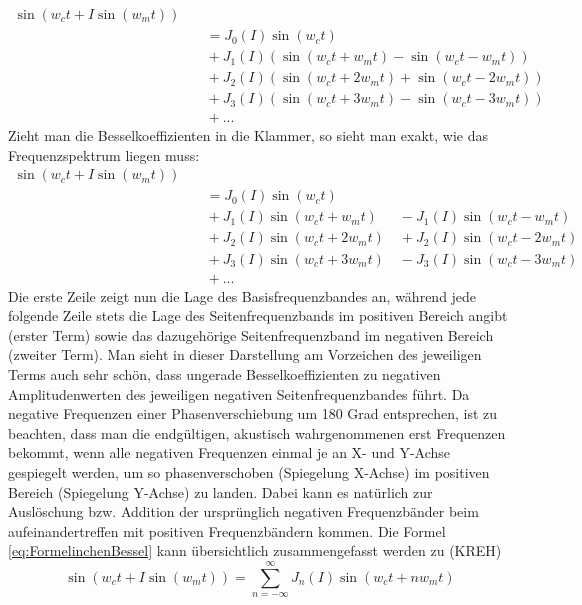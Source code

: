 \begin{equation}
\begin{split}
\sin(w_ct + I\sin(w_mt)) \\ &\quad = J_0(I)\sin(w_ct) \\ &\quad + J_1(I)(\sin(w_ct + w_mt) - \sin(w_ct - w_mt)) \\ &\quad + J_2(I)(\sin(w_ct + 2w_mt)+\sin(w_ct-2w_mt)) \\ &\quad  + J_3(I)(\sin(w_ct + 3w_mt) - \sin(w_ct - 3w_mt)) \\ &\quad  + ...
\end{split}
\end{equation}
Zieht man die Besselkoeffizienten in die Klammer, so sieht man exakt, wie das Frequenzspektrum liegen muss:
\begin{equation}\label{eq:FormelinchenBessel}
\begin{split}
\sin(w_ct + I\sin(w_mt)) \\ &\quad = J_0(I)\sin(w_ct) \\ &\quad + J_1(I)\sin(w_ct + w_mt) \quad\enspace - J_1(I)\sin(w_ct - w_mt) \\ &\quad + J_2(I)\sin(w_ct + 2w_mt) \quad + J_2(I)\sin(w_ct-2w_mt) \\ &\quad  + J_3(I)\sin(w_ct + 3w_mt) \quad - J_3(I)\sin(w_ct - 3w_mt) \\ &\quad  + ...
\end{split}
\end{equation}
Die erste Zeile zeigt nun die Lage des Basisfrequenzbandes an, während jede folgende Zeile stets die Lage des Seitenfrequenzbands im positiven Bereich angibt (erster Term) sowie das dazugehörige Seitenfrequenzband im negativen Bereich (zweiter Term). Man sieht in dieser Darstellung am Vorzeichen des jeweiligen Terms auch sehr schön, dass ungerade Besselkoeffizienten zu negativen Amplitudenwerten des jeweiligen negativen Seitenfrequenzbandes führt. Da negative Frequenzen einer Phasenverschiebung um 180 Grad entsprechen, ist zu beachten, dass man die endgültigen, akustisch wahrgenommenen erst Frequenzen bekommt, wenn alle negativen Frequenzen einmal je an X- und Y-Achse gespiegelt werden, um so phasenverschoben (Spiegelung X-Achse) im positiven Bereich (Spiegelung Y-Achse) zu landen. Dabei kann es natürlich zur Auslöschung bzw. Addition der ursprünglich negativen Frequenzbänder beim aufeinandertreffen mit positiven Frequenzbändern kommen.
Die Formel \ref{eq:FormelinchenBessel} kann übersichtlich zusammengefasst werden zu (KREH)
\begin{equation}\label{esq:Besselbabymonster}
\sin(w_ct + I\sin(w_mt)) = \sum_{n=-\infty}^{\infty}J_n(I)\sin(w_ct+nw_mt)
\end{equation}
